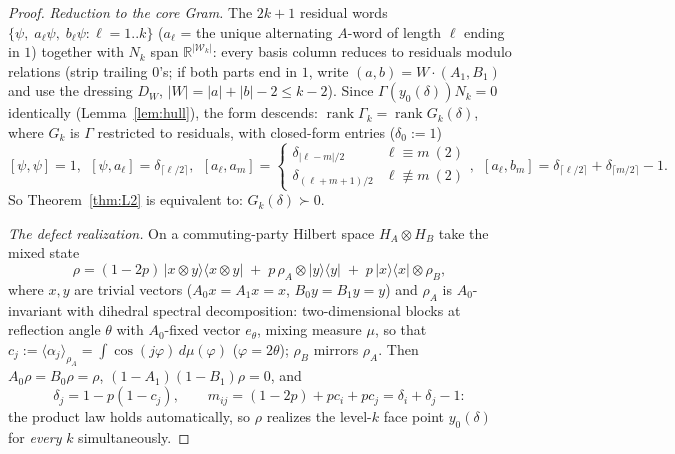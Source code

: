 \documentclass[11pt]{article}
\newcommand{\la}{\langle}
\newcommand{\ra}{\rangle}
\DeclareMathOperator{\rk}{rank}
\begin{document}
\begin{proof}
\emph{Reduction to the core Gram.} The $2k+1$ residual words
$\{\psi,\;a_\ell\psi,\;b_\ell\psi:\ell=1..k\}$ ($a_\ell$ = the unique
alternating $A$-word of length $\ell$ ending in $1$) together with $N_k$
span $\mathbb R^{|\mathcal W_k|}$: every basis column reduces to residuals
modulo relations (strip trailing $0$'s; if both parts end in $1$, write
$(a,b)=W\cdot(A_1,B_1)$ and use the dressing $D_W$, $|W|=|a|+|b|-2\le k-2$).
Since $\Gamma(y_0(\delta))N_k=0$ identically (Lemma~\ref{lem:hull}), the
form descends: $\rk\Gamma_k=\rk G_k(\delta)$, where $G_k$ is $\Gamma$
restricted to residuals, with closed-form entries ($\delta_0:=1$)
\[
[\psi,\psi]=1,\ \ [\psi,a_\ell]=\delta_{\lceil\ell/2\rceil},\ \
[a_\ell,a_m]=\begin{cases}\delta_{|\ell-m|/2}&\ell\equiv m\ (2)\\
\delta_{(\ell+m+1)/2}&\ell\not\equiv m\ (2)\end{cases},\ \
[a_\ell,b_m]=\delta_{\lceil\ell/2\rceil}+\delta_{\lceil m/2\rceil}-1 .
\]
So Theorem~\ref{thm:L2} is equivalent to: $G_k(\delta)\succ0$.

\emph{The defect realization.} On a commuting-party Hilbert space
$H_A\otimes H_B$ take the mixed state
\[
\rho=(1-2p)\,|x\otimes y\ra\la x\otimes y|
\;+\;p\,\rho_A\otimes|y\ra\la y|\;+\;p\,|x\ra\la x|\otimes\rho_B,
\]
where $x,y$ are trivial vectors ($A_0x=A_1x=x$, $B_0y=B_1y=y$) and
$\rho_A$ is $A_0$-invariant with dihedral spectral decomposition:
two-dimensional blocks at reflection angle $\theta$ with $A_0$-fixed vector
$e_\theta$, mixing measure $\mu$, so that
$c_j:=\la\alpha_j\ra_{\rho_A}=\int\cos(j\varphi)\,d\mu(\varphi)$
($\varphi=2\theta$); $\rho_B$ mirrors $\rho_A$. Then $A_0\rho=B_0\rho=\rho$,
$(1-A_1)(1-B_1)\rho=0$, and
\[
\delta_j=1-p(1-c_j),\qquad
m_{ij}=(1-2p)+pc_i+pc_j=\delta_i+\delta_j-1:
\]
the product law holds automatically, so $\rho$ realizes the level-$k$ face
point $y_0(\delta)$ for \emph{every} $k$ simultaneously.


\end{proof}
\end{document}
